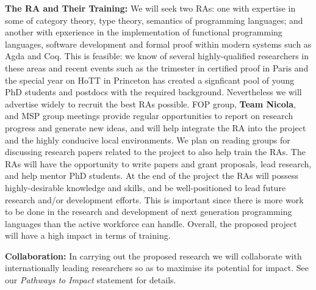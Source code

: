 \documentclass[a4paper,11pt]{article}
\begin{document}
{\bf The RA and Their Training:} We will seek two RAs: one with
expertise in some of category theory, type theory, semantics of
programming languages; and another with epxerience in the
implementation of functional programming languages, software
development and formal proof within modern systems such as Agda and
Coq. This is feasible: we know of several highly-qualified researchers
in these areas and recent events such as the trimester in certified
proof in Paris and the special year on HoTT in Princeton has created a
signficant pool of young PhD students and postdocs with the required
background. Nevertheless we will advertise widely to recruit the best RAs
possible. %
FOP group, {\bf Team Nicola}, and MSP group meetings
provide regular opportunities to report on research 
progress and generate new ideas, and will help integrate the RA into
the project and the highly conducive local environments.
We plan on reading groups for discussing research
papers 
related to the project to also help train the RAs. The RAs will have
the opportunity to write papers and grant proposals, lead research,
and help mentor PhD students.  At the end of the project the RAs will
possess highly-desirable knowledge and skills, and be well-positioned
to lead future research and/or development efforts. This is important
since there is more work to be done in the research and development of
next generation programming languages than the active workforce can
handle. Overall, the proposed project will have a high impact in terms
of training.

\vspace*{0.02in}

{\bf Collaboration:} In carrying out the proposed research we will
collaborate with internationally leading researchers so as to maximise
its potential for impact. See our {\em Pathways to
  Impact} statement for details.

\end{document}
